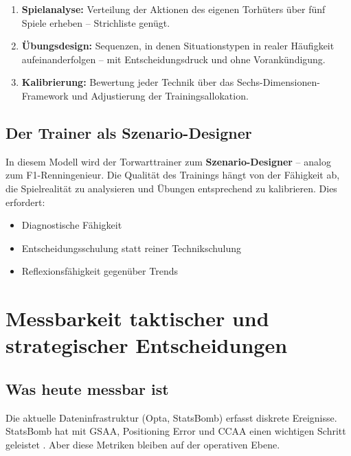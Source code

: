 \documentclass[12pt,a4paper]{article}
\begin{document}
\begin{enumerate}
  \item \textbf{Spielanalyse:} Verteilung der Aktionen des eigenen Torh\"uters \"uber f\"unf Spiele erheben -- Strichliste gen\"ugt.
  \item \textbf{\"Ubungsdesign:} Sequenzen, in denen Situationstypen in realer H\"aufigkeit aufeinanderfolgen -- mit Entscheidungsdruck und ohne Vorank\"undigung.
  \item \textbf{Kalibrierung:} Bewertung jeder Technik \"uber das Sechs-Dimensionen-Framework und Adjustierung der Trainingsallokation.
\end{enumerate}


\subsection{Der Trainer als Szenario-Designer}
\label{sec:szenario-designer}

In diesem Modell wird der Torwarttrainer zum \textbf{Szenario-Designer} -- analog zum F1-Renningenieur. Die Qualit\"at des Trainings h\"angt von der F\"ahigkeit ab, die Spielrealit\"at zu analysieren und \"Ubungen entsprechend zu kalibrieren. Dies erfordert:

\begin{itemize}[nosep]
  \item Diagnostische F\"ahigkeit
  \item Entscheidungsschulung statt reiner Technikschulung
  \item Reflexionsf\"ahigkeit gegen\"uber Trends
\end{itemize}


\section{Messbarkeit taktischer und strategischer Entscheidungen}
\label{sec:messbarkeit}

\subsection{Was heute messbar ist}
\label{sec:messbar-heute}

Die aktuelle Dateninfrastruktur (Opta, StatsBomb) erfasst diskrete Ereignisse. StatsBomb hat mit GSAA, Positioning Error und CCAA einen wichtigen Schritt geleistet \citep{statsbomb2023}. Aber diese Metriken bleiben auf der operativen Ebene.
\end{document}
